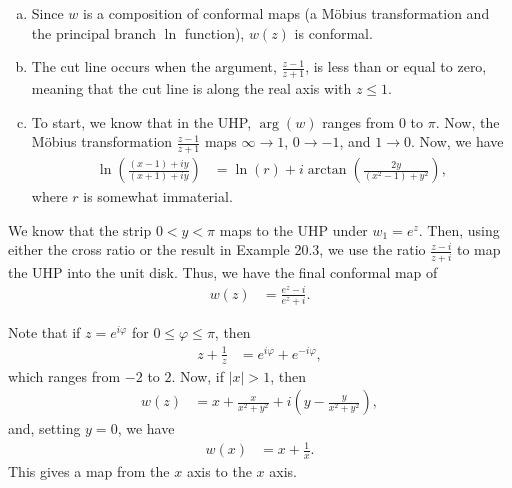 \documentclass[10pt]{mypackage}
\begin{document}
\begin{solution}[20.11]\hfill
  \begin{enumerate}[(a)]
    \item Since $w$ is a composition of conformal maps (a Möbius transformation and the principal branch $\ln$ function), $w(z)$ is conformal.
    \item The cut line occurs when the argument, $\frac{z-1}{z+1}$, is less than or equal to zero, meaning that the cut line is along the real axis with $z \leq 1$.
    \item To start, we know that in the UHP, $\arg(w)$ ranges from $0$ to $\pi$. Now, the Möbius transformation $\frac{z-1}{z+1}$ maps $\infty \rightarrow 1$, $0\rightarrow -1$, and $1 \rightarrow 0$. Now, we have
      \begin{align*}
        \ln\left( \frac{\left( x-1 \right) + iy}{\left( x+1 \right) + iy} \right) &= \ln \left( r \right) + i \arctan \left( \frac{2y}{\left( x^2 -1 \right) + y^2} \right),
      \end{align*}
      where $r$ is somewhat immaterial.
  \end{enumerate}
\end{solution}
\begin{solution}[20.12]
  We know that the strip $0 < y < \pi$ maps to the UHP under $w_1 = e^z$. Then, using either the cross ratio or the result in Example 20.3, we use the ratio $\frac{z-i}{z+i}$ to map the UHP into the unit disk. Thus, we have the final conformal map of 
  \begin{align*}
    w(z) &= \frac{e^{z}- i}{e^{z} + i}.
  \end{align*}
\end{solution}
\begin{solution}[20.14]
  Note that if $z = e^{i\varphi}$ for $0 \leq \varphi \leq \pi$, then
  \begin{align*}
    z + \frac{1}{z} &= e^{i\varphi} + e^{-i\varphi},
  \end{align*}
  which ranges from $-2$ to $2$. Now, if $|x| > 1$, then
  \begin{align*}
    w\left( z \right) &= x + \frac{x}{x^2 + y^2} + i \left( y - \frac{y}{x^2 + y^2} \right),
  \end{align*}
  and, setting $y = 0$, we have
  \begin{align*}
    w(x) &= x + \frac{1}{x}.
  \end{align*}
  This gives a map from the $x$ axis to the $x$ axis.
\end{solution}
\begin{solution}[20.15]

\end{solution}
\begin{solution}[20.16]

\end{solution}
\begin{solution}[20.17]

\end{solution}
\end{document}
